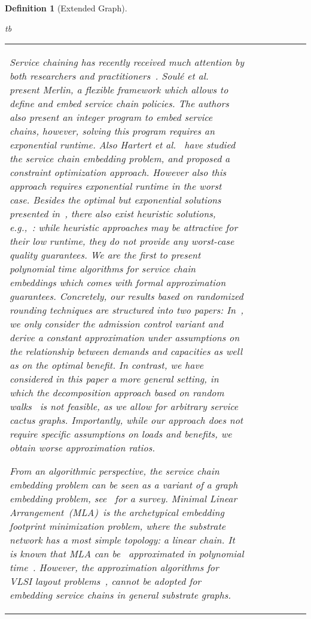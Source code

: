 \documentclass[10pt, conference, letterpaper]{IEEEtran}
\newtheorem{definition}[theorem]{Definition}
\begin{document}
\begin{definition}[Extended Graph]
{\begin{IPFormulation}{tb}
{\begin{tabular}{FFCLLBB}
Service chaining
has recently received much attention by
both researchers and practitioners~\cite{karl-chains,ewsdn14,stefano-sigc,merlin}. 
Soul\'{e} et al.~\cite{merlin} present Merlin,
a flexible framework which allows
to define and embed service chain policies.
The authors also present an integer program
to embed service chains, however, solving
this program requires an exponential runtime. 
Also
Hartert et al.~\cite{stefano-sigc} have studied
the service chain embedding problem,
and proposed a constraint optimization
approach. However also this approach
requires exponential runtime in the worst case.
Besides the optimal but exponential
solutions presented in~\cite{stefano-sigc,merlin}, 
there also exist heuristic solutions, e.g.,~\cite{karl-chains,ewsdn14}:
while heuristic approaches may be attractive for their
low runtime, they do not provide any
worst-case quality guarantees. 
We are the first to present
polynomial time algorithms for service chain embeddings
which comes with formal approximation guarantees.
Concretely, our results based on randomized rounding techniques
are structured into two papers:
In~\cite{swat-guy}, we only consider the admission control variant
and derive a constant approximation under assumptions on the relationship
between demands and capacities as well as on the optimal benefit.
In contrast, we have considered in this paper a more general
setting, in which the decomposition approach based on random walks~\cite{swat-guy}
 is not feasible, as we allow for arbitrary service cactus graphs.
Importantly, while our approach does not require specific assumptions on loads and benefits, we obtain
worse approximation ratios. 

From an algorithmic perspective, 
the service chain embedding problem
can be seen as a variant of  a
graph embedding problem, see~\cite{diaz2002survey} for a survey.
Minimal Linear Arrangement~(MLA)~is the archetypical
embedding footprint minimization problem,
where the substrate network has a most simple topology:
a linear chain.
It is known that MLA can be~ approximated in
polynomial time~\cite{best-mla-1,mla-best-2}.
However, the approximation algorithms 
for VLSI layout problems~\cite{diaz2002survey,vlsi-layout},
cannot be adopted for embedding service chains in 
general substrate graphs.


\end{tabular}}
\end{IPFormulation}}
\end{definition}
\end{document}
